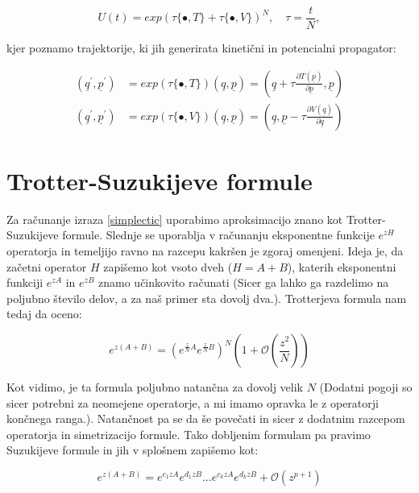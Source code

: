 \documentclass[a4paper]{article}
\newcommand{\pder}[2]{\frac{\partial#1}{\partial#2}}
\newcommand{\q}{\underline{q}}
\newcommand{\p}{\underline{p}}
\newcommand{\bigO}[1]{\mathcal{O}\left( #1 \right)}
\begin{document}
    \begin{equation}\label{simplectic}
        U(t) = exp\left( \tau\{\bullet, T\} + \tau\{\bullet, V\} \right)^N, \quad \tau = \frac{t}{N},
    \end{equation}

    kjer poznamo trajektorije, ki jih generirata kinetični in potencialni propagator:

    \begin{equation}\label{baseTrajectories}
        \begin{split}
            (\q^\prime, \p^\prime) &= exp\left( \tau\{\bullet, T\}\right) (\q, \p) = \left( \q + \tau\pder{T(\p)}{\p}, \p \right) \\
            (\q^\prime, \p^\prime) &= exp\left( \tau\{\bullet, V\}\right) (\q, \p) = \left( \q, \p -\tau\pder{V(\q)}{\q} \right)
        \end{split}
    \end{equation}

	\section{Trotter-Suzukijeve formule}

    Za računanje izraza \ref{simplectic} uporabimo aproksimacijo znano kot Trotter-Suzukijeve formule. Slednje se uporablja v računanju 
    eksponentne funkcije $e^{zH}$ operatorja in temeljijo ravno  na razcepu kakršen je zgoraj omenjeni. Ideja je, da začetni operator $H$ zapišemo
    kot vsoto dveh ($H = A + B$), katerih eksponentni funkciji $e^{zA}$ in $e^{zB}$ znamo učinkovito računati (Sicer ga lahko ga razdelimo na poljubno
    število delov, a za naš primer sta dovolj dva.). Trotterjeva formula nam tedaj da oceno:

    \begin{equation}\label{trotter}
        e^{z(A + B)} = \left( e^{\frac{z}{N}A}e^{\frac{z}{N}B} \right)^N \left( 1 + \bigO{\frac{z^2}{N}} \right)
    \end{equation}

    Kot vidimo, je ta formula poljubno natančna za dovolj velik $N$ (Dodatni pogoji so sicer potrebni za neomejene operatorje, a mi imamo opravka
    le z operatorji končnega ranga.). Natančnost pa se da še povečati in sicer z dodatnim razcepom operatorja in simetrizacijo formule. Tako dobljenim
    formulam pa pravimo Suzukijeve formule in jih v splošnem zapišemo kot:

    \begin{equation}\label{suzuki}
        e^{z(A + B)} = e^{c_1zA} e^{d_1zB} ... e^{c_kzA} e^{d_kzB} + \bigO{z^{p+1}}
    \end{equation}
\end{document}
